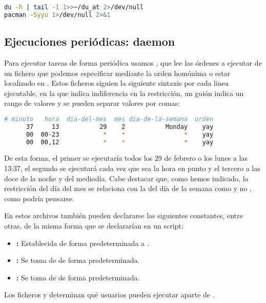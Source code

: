 \begin{lstlisting}[language=Bash]
du -h | tail -1 1>>~/du_at 2>/dev/null
pacman -Syyu 1>/dev/null 2>&1
\end{lstlisting}

\subsection{Ejecuciones periódicas: daemon }

Para ejecutar tareas de forma periódica usamos , que lee las órdenes a ejecutar de un fichero  que podemos especificar mediante la orden homónima o estar localizado en .
Estos ficheros siguien la siguiente sintaxis por cada línea ejecutable, en la que \code{*} indica indiferencia en la restricción, un guión indica un rango de valores y se pueden separar valores por comas:

\begin{lstlisting}[language=Bash]
# minuto   hora  dia-del-mes  mes dia-de-la-semana  orden
      37     13           29    2           Monday    yay
      00  00-23            *    *                *    yay
      00  00,12            *    *                *    yay
\end{lstlisting}

De esta forma, el primer  se ejecutaría todos los 29 de febrero o los lunes a las 13:37, el segundo se ejecutará cada vez que sea la hora en punto y el tercero a las doce de la noche y del mediodía.
Cabe destacar que, como hemos indicado, la restricción del día del mes se relaciona con la del día de la semana como  y no , como podría pensarse.

En estos archivos también pueden declararse las siguientes constantes, entre otras, de la misma forma que se declararían en un script:

\begin{itemize}
	\item{}\textbf{:} Establecida de forma predeterminada a .
	\item{}\textbf{:} Se toma de  de forma predeterminada.
	\item{}\textbf{:} Se toma de  de forma predeterminada.
\end{itemize}

Los ficheros  y  determinan qué usuarios pueden ejecutar  aparte de .

